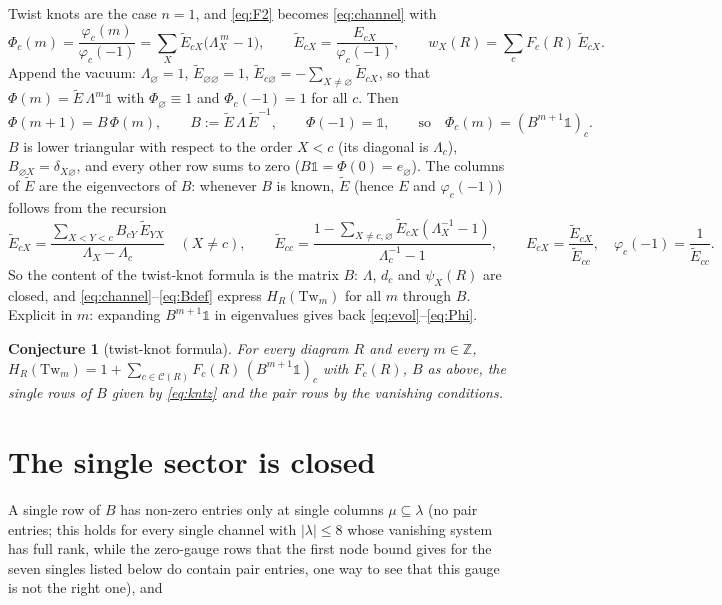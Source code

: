 \documentclass[11pt]{article}
\newtheorem{conjecture}{Conjecture}
\newcommand{\Tw}{\mathrm{Tw}}
\newcommand{\Lam}{\Lambda}
\newcommand{\Et}{\widetilde{E}}
\newcommand{\vac}{\varnothing}
\newcommand{\one}{\mathbb 1}
\newcommand{\Chan}{\mathcal C}
\begin{document}
Twist knots are the case $n=1$, and \eqref{eq:F2} becomes \eqref{eq:channel} with
\begin{equation}\label{eq:Phi}
\Phi_c(m)=\frac{\varphi_c(m)}{\varphi_c(-1)}=\sum_{X}\Et_{cX}\bigl(\Lam_X^{\,m}-1\bigr),\qquad
\Et_{cX}=\frac{E_{cX}}{\varphi_c(-1)},\qquad w_X(R)=\sum_c F_c(R)\,\Et_{cX}.
\end{equation}
Append the vacuum: $\Lam_\vac=1$, $\Et_{\vac\vac}=1$, $\Et_{c\vac}=-\sum_{X\ne\vac}\Et_{cX}$, so that
$\Phi(m)=\Et\,\Lam^m\one$ with $\Phi_\vac\equiv1$ and $\Phi_c(-1)=1$ for all $c$.  Then
\begin{equation}\label{eq:Bdef}
\Phi(m+1)=B\,\Phi(m),\qquad B:=\Et\,\Lam\,\Et^{-1},\qquad \Phi(-1)=\one,\qquad\text{so}\quad \Phi_c(m)=(B^{m+1}\one)_c .
\end{equation}
$B$ is lower triangular with respect to the order $X<c$ (its diagonal is $\Lam_c$), $B_{\vac X}=\delta_{X\vac}$, and
every other row sums to zero ($B\one=\Phi(0)=e_\vac$).  The columns of $\Et$ are the eigenvectors of $B$: whenever
$B$ is known, $\Et$ (hence $E$ and $\varphi_c(-1)$) follows from the recursion
\begin{equation}\label{eq:eigrec}
\Et_{cX}=\frac{\sum_{X<Y<c}B_{cY}\,\Et_{YX}}{\Lam_X-\Lam_c}\quad(X\ne c),\qquad
\Et_{cc}=\frac{1-\sum_{X\ne c,\vac}\Et_{cX}(\Lam_X^{-1}-1)}{\Lam_c^{-1}-1},\qquad
E_{cX}=\frac{\Et_{cX}}{\Et_{cc}},\quad \varphi_c(-1)=\frac1{\Et_{cc}}.
\end{equation}
So the content of the twist-knot formula is the matrix $B$: $\Lam$, $d_c$ and $\psi_X(R)$ are closed, and
\eqref{eq:channel}--\eqref{eq:Bdef} express $H_R(\Tw_m)$ for all $m$ through $B$.  Explicit in $m$: expanding
$B^{m+1}\one$ in eigenvalues gives back \eqref{eq:evol}--\eqref{eq:Phi}.

\begin{conjecture}[twist-knot formula]\label{conj:main}
For every diagram $R$ and every $m\in\mathbb Z$, $H_R(\Tw_m)=1+\sum_{c\in\Chan(R)}F_c(R)\,(B^{m+1}\one)_c$ with
$F_c(R)$, $B$ as above, the single rows of $B$ given by \eqref{eq:kntz} and the pair rows by the vanishing conditions.
\end{conjecture}

\section{The single sector is closed}\label{sec:single}

A single row of $B$ has non-zero entries only at single columns $\mu\subseteq\lambda$ (no pair entries; this holds for
every single channel with $|\lambda|\le 8$ whose vanishing system has full rank, while the zero-gauge rows that the
first node bound gives for the seven singles listed below do contain pair entries, one way to see that this gauge is not
the right one), and
\end{document}
